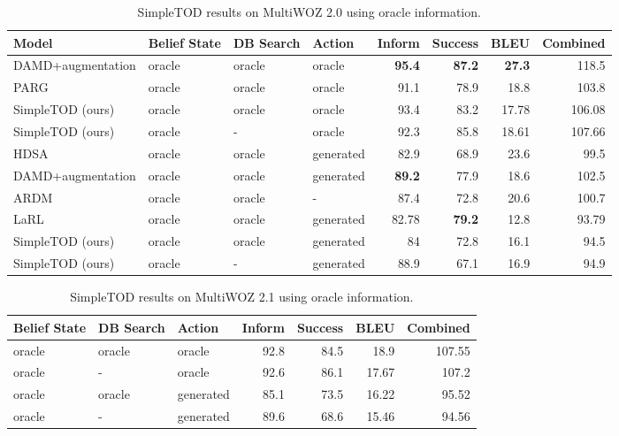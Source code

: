 \documentclass{article}
\begin{document}
\begin{table*}[htb!]
\centering
\small
\begin{tabular}{llllrrrr}
\hline
Model & Belief State & DB Search & Action & Inform &Success & BLEU & Combined\\
\hline
DAMD+augmentation & oracle & oracle & oracle & \textbf{95.4} & \textbf{87.2} & \textbf{27.3} & 118.5 \\
PARG & oracle & oracle & oracle & 91.1 & 78.9 & 18.8 & 103.8 \\
SimpleTOD (ours) & oracle & oracle & oracle & 93.4 & 83.2 & 17.78 & 106.08 \\
SimpleTOD (ours) & oracle & - & oracle & 92.3 & 85.8 & 18.61 & 107.66 \\
\hline
HDSA & oracle & oracle & generated & 82.9 & 68.9 & 23.6 & 99.5 \\
DAMD+augmentation & oracle & oracle & generated & \textbf{89.2} & 77.9 & 18.6 & 102.5 \\
ARDM & oracle & oracle & - & 87.4 & 72.8 & 20.6 & 100.7 \\
LaRL & oracle & oracle & generated & 82.78 & \textbf{79.2} & 12.8 & 93.79 \\
SimpleTOD (ours) & oracle & oracle & generated & 84 & 72.8 & 16.1 & 94.5 \\
SimpleTOD (ours) & oracle & - & generated & 88.9 & 67.1 & 16.9 & 94.9 \\
\hline
\end{tabular}
\caption{\label{tab:joint-task}
SimpleTOD results on MultiWOZ 2.0 using oracle information.
}
\end{table*}



 
\begin{table*}[htb!]
\centering
\small
\begin{tabular}{lllrrrr}
\hline
  Belief State & DB Search & Action & Inform &Success & BLEU & Combined\\
\hline

 oracle & oracle & oracle & 92.8 & 84.5 & 18.9 & 107.55 \\

  oracle & - & oracle & 92.6 & 86.1 & 17.67 & 107.2 \\
  \hline

 oracle & oracle & generated & 85.1 & 73.5 & 16.22 & 95.52 \\

  oracle & - & generated & 89.6 & 68.6 & 15.46 & 94.56 \\
  




\hline
\end{tabular}
\caption{\label{tab:appendix-joint-task-2.1}
SimpleTOD results on MultiWOZ 2.1 using oracle information.
}
\end{table*}
\end{document}
